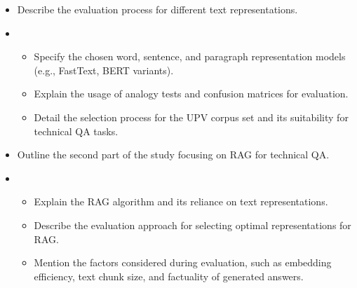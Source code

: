 %


\begin{itemize}
    \item Describe the evaluation process for different text representations.
    \item \begin{itemize}
        \item{Specify the chosen word, sentence, and paragraph representation models (e.g., FastText, BERT variants).}
        \item{Explain the usage of analogy tests and confusion matrices for evaluation.}
        \item{Detail the selection process for the UPV corpus set and its suitability for technical QA tasks.}
      \end{itemize}
    \item Outline the second part of the study focusing on RAG for technical QA.
    \item \begin{itemize}
        \item{Explain the RAG algorithm and its reliance on text representations.}
        \item{Describe the evaluation approach for selecting optimal representations for RAG.}
        \item{Mention the factors considered during evaluation, such as embedding efficiency, text chunk size, and factuality of generated answers.}
      \end{itemize}
\end{itemize}









